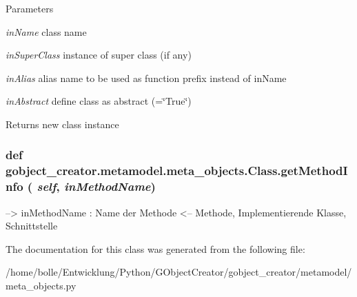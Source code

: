 \begin{DoxyParams}{Parameters}
\item[{\em inName}]class name \item[{\em inSuperClass}]instance of super class (if any) \item[{\em inAlias}]alias name to be used as function prefix instead of inName \item[{\em inAbstract}]define class as abstract (=\char`\"{}True\char`\"{}) \end{DoxyParams}
\begin{DoxyReturn}{Returns}
new class instance 
\end{DoxyReturn}
\hypertarget{classgobject__creator_1_1metamodel_1_1meta__objects_1_1Class_a910fc43f8f41895ca1d6f3a7d59baa33}{
\subsubsection[{getMethodInfo}]{\setlength{\rightskip}{0pt plus 5cm}def gobject\_\-creator.metamodel.meta\_\-objects.Class.getMethodInfo ( {\em self}, \/   {\em inMethodName})}}
\label{classgobject__creator_1_1metamodel_1_1meta__objects_1_1Class_a910fc43f8f41895ca1d6f3a7d59baa33}
\begin{DoxyVerb}
--> inMethodName : Name der Methode
<-- Methode, Implementierende Klasse, Schnittstelle
\end{DoxyVerb}
 

The documentation for this class was generated from the following file:\begin{DoxyCompactItemize}
\item 
/home/bolle/Entwicklung/Python/GObjectCreator/gobject\_\-creator/metamodel/meta\_\-objects.py\end{DoxyCompactItemize}
